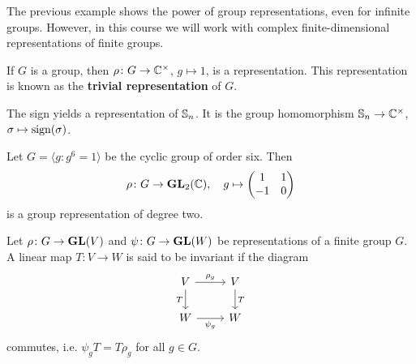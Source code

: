 The previous example shows the power of group representations, even for infinite groups.   
However, in this course we will work with complex finite-dimensional 
representations of finite
groups.  

\begin{example}
	If $G$ is a group, then $\rho\colon G\to\mathbb{C}^\times$, $g\mapsto 1$, 
	is a representation. This representation is known as the \textbf{trivial representation} of $G$. 	
\end{example}

\begin{example}
	The sign yields a representation of $\mathbb{S}_n$. It is the group homomorphism
	$\mathbb{S}_n\to\mathbb{C}^\times$, $\sigma\mapsto\operatorname{sign}(\sigma)$.  	
\end{example}

\begin{example}
	Let $G=\langle g:g^6=1\rangle$ be the cyclic group of order six. Then
	\[
	\rho\colon G\to\mathbf{GL}_2(\mathbb{C}),
	\quad 
	g\mapsto\begin{pmatrix}1&1\\-1&0\end{pmatrix}
	\] 
	is a group representation of degree two. 
\end{example}

%
%
%
%
\begin{definition}
    Let $\rho\colon G\to\mathbf{GL}(V)$ and $\psi\colon G\to\mathbf{GL}(W)$ be
    representations of a finite group $G$. A linear map $T\colon V\to W$ is said to be invariant
    if the diagram
    \[\begin{tikzcd}
	V & V \\
	W & W
	\arrow["{\rho_g}", from=1-1, to=1-2]
	\arrow["T"', from=1-1, to=2-1]
	\arrow["{\psi_g}"', from=2-1, to=2-2]
	\arrow["T", from=1-2, to=2-2]
\end{tikzcd}\]
    commutes, i.e. $\psi_gT=T\rho_g$ for all $g\in G$.
\end{definition}

